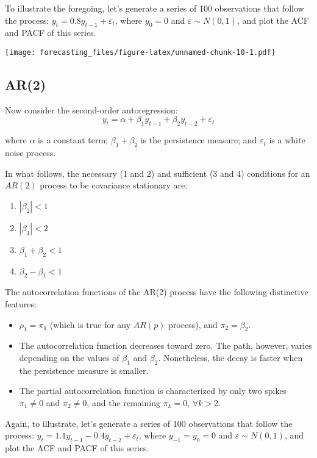 \documentclass[
  oneside]{book}
\providecommand{\tightlist}{%
  \setlength{\itemsep}{0pt}\setlength{\parskip}{0pt}}
\begin{document}
To illustrate the foregoing, let's generate a series of 100 observations that follow the process: \(y_t=0.8y_{t-1}+\varepsilon_t\), where \(y_0=0\) and \(\varepsilon\sim N(0,1)\), and plot the ACF and PACF of this series.

\texttt{[image: forecasting\_files/figure-latex/unnamed-chunk-10-1.pdf]}

\hypertarget{ar2}{%
\subsection{AR(2)}\label{ar2}}

Now consider the second-order autoregression: \[y_t = \alpha + \beta_1 y_{t-1} + \beta_2 y_{t-2} + \varepsilon_t\]

where \(\alpha\) is a constant term; \(\beta_1+\beta_2\) is the persistence measure; and \(\varepsilon_t\) is a white noise process.

In what follows, the necessary (1 and 2) and sufficient (3 and 4) conditions for an \(AR(2)\) process to be covariance stationary are:

\begin{enumerate}
\def\labelenumi{\arabic{enumi}.}
\tightlist
\item
  \(|\beta_2| < 1\)
\item
  \(|\beta_1| < 2\)
\item
  \(\beta_1 + \beta_2 < 1\)
\item
  \(\beta_2 - \beta_1 < 1\)
\end{enumerate}

The autocorrelation functions of the AR(2) process have the following distinctive features:

\begin{itemize}
\tightlist
\item
  \(\rho_1 = \pi_1\) (which is true for any \(AR(p)\) process), and \(\pi_2 = \beta_2\).
\item
  The autocorrelation function decreases toward zero. The path, however, varies depending on the values of \(\beta_1\) and \(\beta_2\). Nonetheless, the decay is faster when the persistence measure is smaller.
\item
  The partial autocorrelation function is characterized by only two spikes \(\pi_1 \neq 0\) and \(\pi_2 \neq 0\), and the remaining \(\pi_k = 0\), \(\forall k > 2\).
\end{itemize}

Again, to illustrate, let's generate a series of 100 observations that follow the process: \(y_t=1.1y_{t-1}-0.4y_{t-2}+\varepsilon_t\), where \(y_{-1}=y_0=0\) and \(\varepsilon\sim N(0,1)\), and plot the ACF and PACF of this series.
\end{document}

